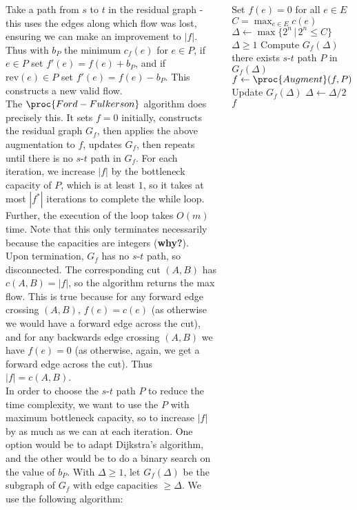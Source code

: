 \documentclass{tikzposter} %
\begin{document}
\begin{columns}
{  Take a path from $s$ to $t$ in the residual graph - this uses the edges along which flow was lost, ensuring we can make an improvement to $|f|$. Thus with $b_{P}$ the minimum $c_{f}(e)$ for $e \in P$, if $e \in P$ set $f'(e) = f(e) + b_{P}$, and if $\mathrm{rev}(e) \in P$ set $f'(e) = f(e) - b_{P}$. This constructs a new valid flow. \\

  The $\proc{Ford-Fulkerson}$ algorithm does precisely this. It sets $f = 0$ initially, constructs the residual graph $G_{f}$, then applies the above augmentation to $f$, updates $G_{f}$, then repeats until there is no $s$-$t$ path in $G_{f}$. For each iteration, we increase $|f|$ by the bottleneck capacity of $P$, which is at least $1$, so it takes at most $|f^{*}|$ iterations to complete the while loop. Further, the execution of the loop takes $O(m)$ time. Note that this only terminates necessarily because the capacities are integers (\textbf{why?}).  \\

  Upon termination, $G_{f}$ has no $s$-$t$ path, so disconnected. The corresponding cut $(A,B)$ has $c(A, B) = |f|$, so the algorithm returns the max flow. This is true because for any forward edge crossing $(A,B)$, $f(e) = c(e)$ (as otherwise we would have a forward edge across the cut), and for any backwards edge crossing $(A,B)$ we have $f(e) = 0$ (as otherwise, again, we get a forward edge across the cut). Thus $|f| = c(A,B)$.\\

  In order to choose the $s$-$t$ path $P$ to reduce the time complexity, we want to use the $P$ with maximum bottleneck capacity, so to increase $|f|$ by as much as we can at each iteration. One option would be to adapt Dijkstra's algorithm, and the other would be to do a binary search on the value of $b_{P}$. With $\Delta \ge 1$, let $G_{f}(\Delta)$ be the subgraph of $G_{f}$ with edge capacities $\ge \Delta$. We use the following algorithm:

  \begin{codebox}
  \li Set $f(e) = 0$ for all $e \in E$
  \li $C = \max_{e \in E} c(e)$
  \li $\Delta \gets \max \{2^{n} \,|\, 2^{n} \le C\}$
  \li \While $\Delta \ge 1$ \Do
  \li     Compute $G_{f}(\Delta)$
  \li     \While there exists $s$-$t$ path $P$ in $G_{f}(\Delta)$ \Do
  \li         $f \gets \proc{Augment}(f, P)$
  \li         Update $G_{f}(\Delta)$
          \End
  \li     $\Delta \gets \Delta / 2$
      \End
  \li \Return $f$
  \end{codebox}

}
\end{columns}
\end{document}
